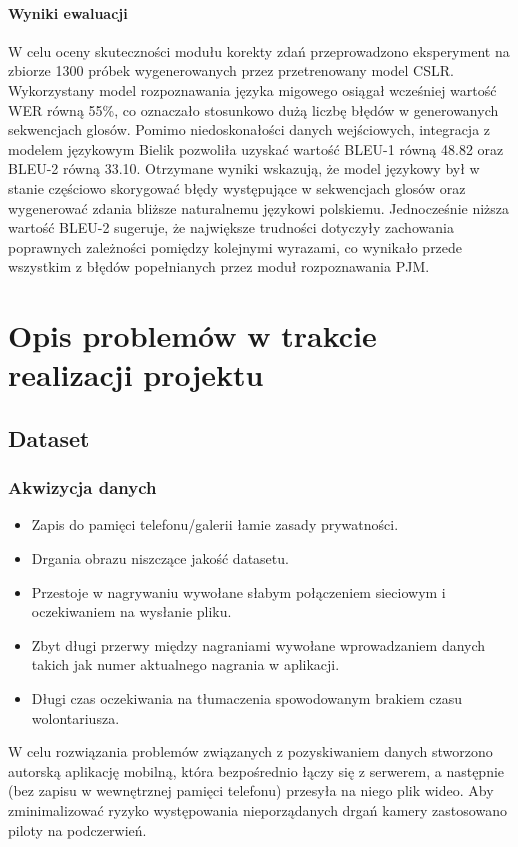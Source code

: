\documentclass[12pt]{article}
\begin{document}
\paragraph{Wyniki ewaluacji}

W celu oceny skuteczności modułu korekty zdań przeprowadzono eksperyment na zbiorze 1300 próbek wygenerowanych przez przetrenowany model CSLR. Wykorzystany model rozpoznawania
języka migowego osiągał wcześniej wartość WER równą 55\%, co oznaczało stosunkowo dużą liczbę błędów w generowanych sekwencjach glosów. Pomimo niedoskonałości danych wejściowych, integracja z modelem językowym Bielik pozwoliła uzyskać wartość BLEU-1 równą 48.82 oraz BLEU-2 równą 33.10. Otrzymane wyniki wskazują, że model językowy był w stanie częściowo skorygować błędy występujące w sekwencjach glosów oraz wygenerować zdania bliższe naturalnemu językowi polskiemu. Jednocześnie niższa wartość BLEU-2 sugeruje, że największe trudności dotyczyły zachowania poprawnych zależności pomiędzy kolejnymi wyrazami, co wynikało przede wszystkim z błędów popełnianych przez moduł rozpoznawania PJM.

\section{Opis problemów w trakcie realizacji projektu}

\subsection{Dataset}
\subsubsection{Akwizycja danych}
\begin{itemize}
    \item Zapis do pamięci telefonu/galerii łamie zasady prywatności.
    \item Drgania obrazu niszczące jakość datasetu.
    \item Przestoje w nagrywaniu wywołane słabym połączeniem sieciowym i oczekiwaniem na wysłanie pliku.
    \item Zbyt długi przerwy między nagraniami wywołane wprowadzaniem danych takich jak numer aktualnego nagrania w aplikacji.
    \item Długi czas oczekiwania na tłumaczenia spowodowanym brakiem czasu wolontariusza.
\end{itemize}

W celu rozwiązania problemów związanych z pozyskiwaniem 
danych stworzono autorską aplikację mobilną, która bezpośrednio łączy się z serwerem, a następnie (bez zapisu w wewnętrznej pamięci telefonu) przesyła na niego plik wideo. Aby zminimalizować ryzyko występowania nieporządanych drgań kamery zastosowano piloty na podczerwień. 
\end{document}
